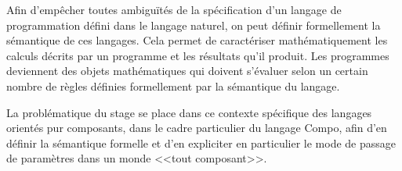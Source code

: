   Afin d’empêcher toutes ambiguïtés de la spécification d'un langage de programmation défini dans le langage naturel, on peut définir formellement la sémantique de ces langages. Cela permet de caractériser mathématiquement les calculs décrits par un programme et les résultats qu'il produit. Les programmes deviennent des objets mathématiques qui doivent s'évaluer selon un certain nombre de règles définies formellement par la sémantique du langage.\\\par
  
  La problématique du stage se place dans ce contexte spécifique des langages orientés pur composants, dans le cadre particulier du langage Compo, afin d'en définir la séman\-ti\-que formelle et d'en expliciter en particulier le mode de passage de paramètres dans un monde <<tout composant>>. \\\par
